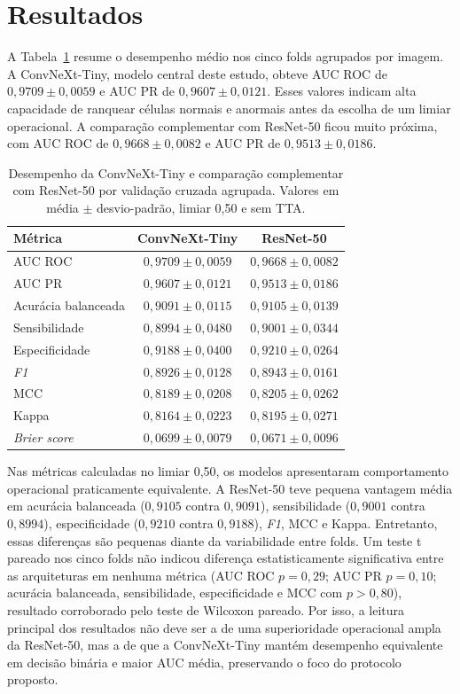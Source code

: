 \section{Resultados}

A Tabela~\ref{tab:cv-modelos} resume o desempenho médio nos cinco folds
agrupados por imagem. A ConvNeXt-Tiny, modelo central deste estudo, obteve AUC
ROC de $0{,}9709\pm0{,}0059$ e AUC PR de $0{,}9607\pm0{,}0121$. Esses valores
indicam alta capacidade de ranquear células normais e anormais antes da escolha
de um limiar operacional. A comparação complementar com ResNet-50 ficou muito
próxima, com AUC ROC de $0{,}9668\pm0{,}0082$ e AUC PR de
$0{,}9513\pm0{,}0186$.

\begin{table}[H]
\centering
\caption{Desempenho da ConvNeXt-Tiny e comparação complementar com ResNet-50
por validação cruzada agrupada. Valores em média $\pm$ desvio-padrão, limiar
0,50 e sem TTA.}
\label{tab:cv-modelos}
\kariellycompacttablefont
\kariellytablecols
\begin{tabular}{lcc}
\toprule
Métrica & ConvNeXt-Tiny & ResNet-50 \\
\midrule
AUC ROC & $0{,}9709\pm0{,}0059$ & $0{,}9668\pm0{,}0082$ \\
AUC PR & $0{,}9607\pm0{,}0121$ & $0{,}9513\pm0{,}0186$ \\
Acurácia balanceada & $0{,}9091\pm0{,}0115$ & $0{,}9105\pm0{,}0139$ \\
Sensibilidade & $0{,}8994\pm0{,}0480$ & $0{,}9001\pm0{,}0344$ \\
Especificidade & $0{,}9188\pm0{,}0400$ & $0{,}9210\pm0{,}0264$ \\
\emph{F1} & $0{,}8926\pm0{,}0128$ & $0{,}8943\pm0{,}0161$ \\
MCC & $0{,}8189\pm0{,}0208$ & $0{,}8205\pm0{,}0262$ \\
Kappa & $0{,}8164\pm0{,}0223$ & $0{,}8195\pm0{,}0271$ \\
\emph{Brier score} & $0{,}0699\pm0{,}0079$ & $0{,}0671\pm0{,}0096$ \\
\bottomrule
\end{tabular}
\end{table}

Nas métricas calculadas no limiar 0,50, os modelos apresentaram comportamento
operacional praticamente equivalente. A ResNet-50 teve pequena vantagem média
em acurácia balanceada ($0{,}9105$ contra $0{,}9091$), sensibilidade
($0{,}9001$ contra $0{,}8994$), especificidade ($0{,}9210$ contra $0{,}9188$),
\emph{F1}, MCC e Kappa. Entretanto, essas diferenças são pequenas diante da
variabilidade entre folds. Um teste t pareado nos cinco folds não indicou
diferença estatisticamente significativa entre as arquiteturas em nenhuma
métrica (AUC ROC $p=0{,}29$; AUC PR $p=0{,}10$; acurácia balanceada,
sensibilidade, especificidade e MCC com $p>0{,}80$), resultado corroborado pelo
teste de Wilcoxon pareado. Por isso, a leitura principal dos resultados não deve
ser a de uma superioridade operacional ampla da ResNet-50, mas a de que a
ConvNeXt-Tiny mantém desempenho equivalente em decisão binária e maior AUC
média, preservando o foco do protocolo proposto.

